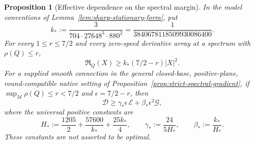 \documentclass[11pt]{article}
\numberwithin{equation}{section}
\newtheorem{proposition}[theorem]{Proposition}
\theoremstyle{definition}
\theoremstyle{remark}
\begin{document}
\begin{proposition}[Effective dependence on the spectral margin]
\label{prop:effective-spectral-margin}
In the model conventions of
Lemma~\ref{lem:sharp-stationary-form}, put
\begin{equation}\label{eq:spectral-margin-k}
 k_*:=\frac{3}{704\cdot27648^3\cdot880^2}
     =\frac1{3840678118509930086400}.
\end{equation}
For every $1\le r\le7/2$ and every zero-speed derivative array
at a spectrum with $\rho(Q)\le r$,
\[
 \mathfrak R_Q(X)\ge k_*(7/2-r)|X|^2.
\]
For a supplied smooth connection in the general closed-base,
positive-plane, round-compatible native setting of
Proposition~\ref{prop:strict-spectral-gradient},
if $\sup_M\rho(Q)\le r<7/2$ and $\epsilon=7/2-r$, then
\begin{equation}\label{eq:native-spectral-margin}
 \mathscr D\ge\gamma_*\epsilon\,\mathscr E
                    +\beta_*\epsilon^2\mathscr G,
\end{equation}
where the universal positive constants are
\begin{equation}\label{eq:spectral-margin-constants}
 H_*:=\frac{1205}{2}+\frac{57600}{k_*}+\frac{25k_*}{4},
 \qquad \gamma_*:=\frac{24}{5H_*},\qquad
 \beta_*:=\frac{k_*}{H_*}.
\end{equation}
These constants are not asserted to be optimal.
\end{proposition}
\end{document}
